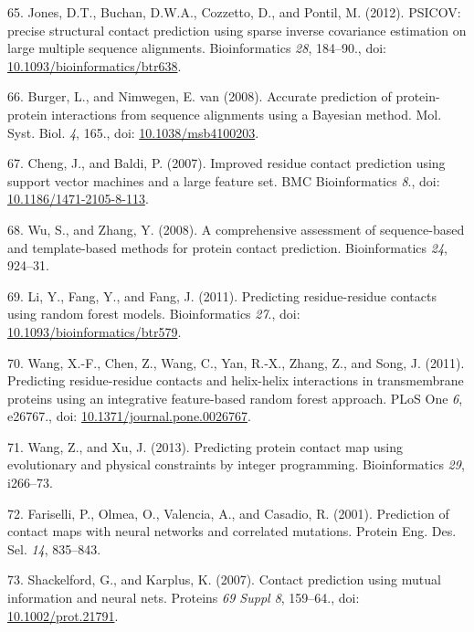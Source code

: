 \documentclass[11pt,a4paper,twoside]{book}
\theoremstyle{definition}
\theoremstyle{definition}
\theoremstyle{remark}
\begin{document}
\hypertarget{ref-Jones2012}{}
65. Jones, D.T., Buchan, D.W.A., Cozzetto, D., and Pontil, M. (2012).
PSICOV: precise structural contact prediction using sparse inverse
covariance estimation on large multiple sequence alignments.
Bioinformatics \emph{28}, 184--90., doi:
\href{https://doi.org/10.1093/bioinformatics/btr638}{10.1093/bioinformatics/btr638}.

\hypertarget{ref-Burger2008}{}
66. Burger, L., and Nimwegen, E. van (2008). Accurate prediction of
protein-protein interactions from sequence alignments using a Bayesian
method. Mol. Syst. Biol. \emph{4}, 165., doi:
\href{https://doi.org/10.1038/msb4100203}{10.1038/msb4100203}.

\hypertarget{ref-Cheng2007}{}
67. Cheng, J., and Baldi, P. (2007). Improved residue contact prediction
using support vector machines and a large feature set. BMC
Bioinformatics \emph{8}., doi:
\href{https://doi.org/10.1186/1471-2105-8-113}{10.1186/1471-2105-8-113}.

\hypertarget{ref-Wu2008}{}
68. Wu, S., and Zhang, Y. (2008). A comprehensive assessment of
sequence-based and template-based methods for protein contact
prediction. Bioinformatics \emph{24}, 924--31.

\hypertarget{ref-Li2011}{}
69. Li, Y., Fang, Y., and Fang, J. (2011). Predicting residue-residue
contacts using random forest models. Bioinformatics \emph{27}., doi:
\href{https://doi.org/10.1093/bioinformatics/btr579}{10.1093/bioinformatics/btr579}.

\hypertarget{ref-Wang2011}{}
70. Wang, X.-F., Chen, Z., Wang, C., Yan, R.-X., Zhang, Z., and Song, J.
(2011). Predicting residue-residue contacts and helix-helix interactions
in transmembrane proteins using an integrative feature-based random
forest approach. PLoS One \emph{6}, e26767., doi:
\href{https://doi.org/10.1371/journal.pone.0026767}{10.1371/journal.pone.0026767}.

\hypertarget{ref-Wang2013}{}
71. Wang, Z., and Xu, J. (2013). Predicting protein contact map using
evolutionary and physical constraints by integer programming.
Bioinformatics \emph{29}, i266--73.

\hypertarget{ref-Fariselli2001a}{}
72. Fariselli, P., Olmea, O., Valencia, A., and Casadio, R. (2001).
Prediction of contact maps with neural networks and correlated
mutations. Protein Eng. Des. Sel. \emph{14}, 835--843.

\hypertarget{ref-Shackelford2007}{}
73. Shackelford, G., and Karplus, K. (2007). Contact prediction using
mutual information and neural nets. Proteins \emph{69 Suppl 8},
159--64., doi:
\href{https://doi.org/10.1002/prot.21791}{10.1002/prot.21791}.
\end{document}

